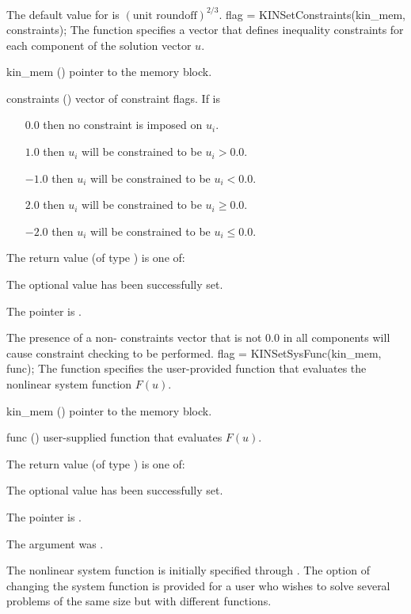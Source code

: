 {
  The default value for  is $(\text{unit roundoff})^{2/3}$.
}
{
flag = KINSetConstraints(kin\_mem, constraints);
}
{
  The function  specifies a vector that defines
  inequality constraints for each component of the solution vector $u$.
}
{
  \begin{args}[constraints]
  \item[kin\_mem] ()
    pointer to the {\kinsol} memory block.
  \item[constraints] ()
    vector of constraint flags. If  is
    \begin{itemize}    
    \item[$0.0$] then no constraint is imposed on $u_i$. 
    \item[$1.0$] then $u_i$ will be constrained to be $u_i > 0.0$.
    \item[$-1.0$] then $u_i$ will be constrained to be $u_i < 0.0$.
    \item[$2.0$] then $u_i$ will be constrained to be $u_i \ge 0.0$.
    \item[$-2.0$] then $u_i$ will be constrained to be $u_i \le 0.0$.
    \end{itemize}
  \end{args}
}
{
  The return value  (of type ) is one of:
  \begin{args}
  \item[\Id{KIN\_SUCCESS}] 
    The optional value has been successfully set.
  \item[\Id{KIN\_MEM\_NULL}]
    The  pointer is .
  \end{args}
}
{
  The presence of a non- constraints vector that is not $0.0$ in
  all components will cause constraint checking to be performed.
}
{
flag = KINSetSysFunc(kin\_mem, func);
}
{
  The function  specifies the user-provided function
  that evaluates the nonlinear system function $F(u)$.
}
{
  \begin{args}
  \item[kin\_mem] ()
    pointer to the {\kinsol} memory block.
  \item[func] ()
    user-supplied function that evaluates $F(u)$.
  \end{args}
}
{
  The return value  (of type ) is one of:
  \begin{args}
  \item[\Id{KIN\_SUCCESS}] 
    The optional value has been successfully set.
  \item[\Id{KIN\_MEM\_NULL}]
    The  pointer is .
  \item[\Id{KIN\_ILL\_INPUT}]
    The argument  was .
  \end{args}
}
{
  The nonlinear system function is initially specified through .
  The option of changing the system function is provided for a user who wishes 
  to solve several problems of the same size but with different functions.
}


